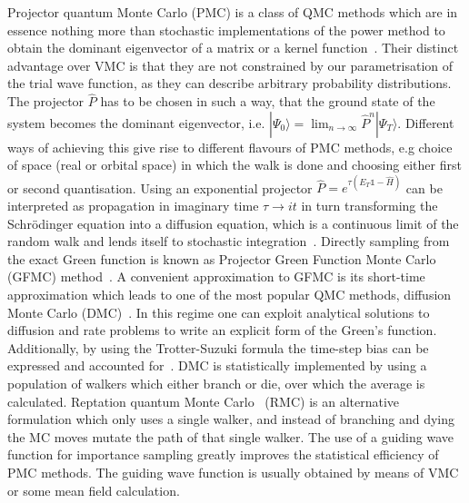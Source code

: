 \documentclass[final,3p,times,twocolumn]{elsarticle}
\begin{document}
	Projector quantum Monte Carlo (PMC) is a class of QMC methods which are in essence nothing more than stochastic implementations of the power method to obtain the dominant eigenvector of a matrix or a kernel function~\cite{gubernatis_kawashima_werner_2016}. Their distinct advantage over VMC is that they are not constrained by our parametrisation of the trial wave function, as they can describe arbitrary probability distributions. The projector $\hat P$ has to be chosen in such a way, that the ground state of the system becomes the dominant eigenvector, i.e. $| \Psi_{0}\rangle = \lim_{n\rightarrow \infty} \hat{P}^n |\Psi_{T}\rangle$. Different ways of achieving this give rise to different flavours of PMC methods, e.g choice of space (real or orbital space) in which the walk is done and choosing either first or second quantisation. Using an exponential projector $\hat{P} = e^{\tau (E_T \mathbb{1} - \hat{H})}$ can be interpreted as propagation in imaginary time $\tau \rightarrow it$ in turn transforming the Schr\"odinger equation into a diffusion equation, which is a continuous limit of the random walk and lends itself to stochastic integration~\cite{reynolds1990diffusion}. Directly sampling from the exact Green function is known as Projector Green Function Monte Carlo (GFMC) method~\cite{kalos1962monte, kalos1966stochastic}. A convenient approximation to GFMC is its short-time approximation which leads to one of the most popular QMC methods, diffusion Monte Carlo (DMC)~\cite{foulkes2001quantum, reynolds1990diffusion}. In this regime one can exploit analytical solutions to diffusion and rate problems to write an explicit form of the Green's function. Additionally, by using the Trotter-Suzuki formula the time-step bias can be expressed and accounted for~\cite{austin2012quantum}. DMC is statistically implemented by using a population of walkers which either branch or die, over which the average is calculated. Reptation quantum Monte Carlo~\cite{reynolds1990diffusion} (RMC) is an alternative formulation which only uses a single walker, and instead of branching and dying the MC moves mutate the path of that single walker. The use of a guiding wave function for importance sampling greatly improves the statistical efficiency of PMC methods. The guiding wave function is usually obtained by means of VMC or some mean field calculation. 
		
\end{document}
